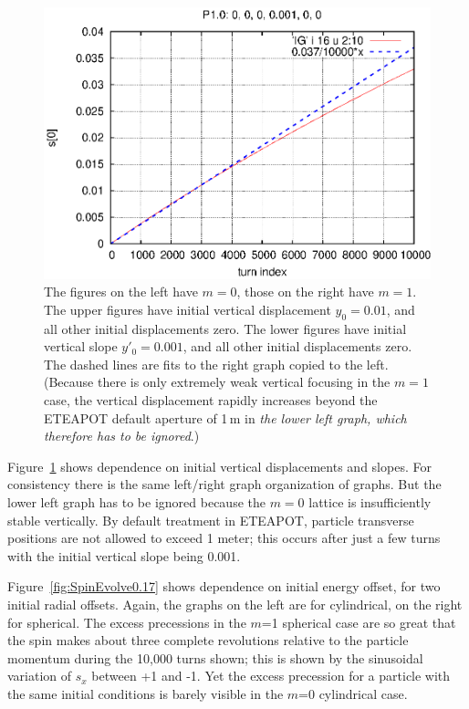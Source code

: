 \documentclass[]{article}
\begin{document}
\begin{figure}[h]
\includegraphics[scale=0.6]{eps/SpinEvolve16.P1.0.eps}
\caption{\label{fig:SpinEvolve15.16}The figures on the left have 
$m=0$, those on the right have $m=1$. The upper figures
have initial vertical displacement $y_0=0.01$, and all other
initial displacements zero.  The lower figures
have initial vertical slope $y'_0=0.001$, and all other
initial displacements zero. The dashed lines are fits to
the right graph copied to the left. (Because there is
only extremely weak
vertical focusing in the $m=1$ case, the vertical displacement
rapidly increases beyond the ETEAPOT default aperture of 1\,m
in \emph{the lower left graph, which therefore has to be ignored}.)
}
\end{figure}
%
Figure~\ref{fig:SpinEvolve15.16} shows dependence on initial
vertical displacements and slopes. For consistency there is
the same left/right graph organization of graphs.
But the lower left graph has to be ignored because the
$m=0$ lattice is insufficiently stable vertically. 
By default treatment in ETEAPOT, particle transverse positions 
are not allowed to exceed 1 meter; this occurs after just a 
few turns with the initial vertical slope being 0.001.

Figure~\ref{fig:SpinEvolve0.17} shows dependence on initial
energy offset, for two initial radial offsets. Again, the
graphs on the left are for cylindrical, on the right for
spherical. The excess precessions in the $m$=1 spherical case are
so great that the spin makes about three complete revolutions
relative to the particle momentum during the 10,000 turns
shown; this is shown by the sinusoidal variation of $s_x$
between +1 and -1.
Yet the excess precession for a particle with the same initial
conditions is barely visible in the $m$=0 cylindrical case.
\end{document}
